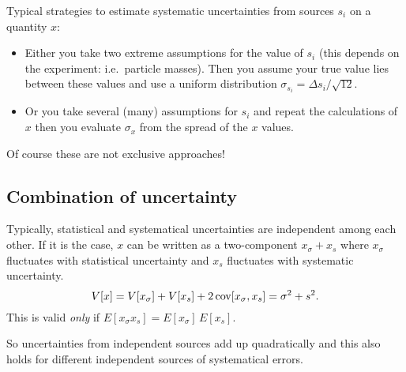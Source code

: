 Typical strategies to estimate systematic uncertainties from sources $s_i$ on a quantity $x$:
\begin{itemize}
	\item
		Either you take two extreme assumptions for the value of $s_i$ (this depends on the experiment: i.e.~particle masses).
		Then you assume your true value lies between these values and use a uniform distribution $\sigma_{s_i} = \Delta s_i/\sqrt{12}$.
	\item
		Or you take several (many) assumptions for $s_i$ and repeat the calculations of $x$ then you evaluate $\sigma_x$ from the spread of the $x$ values.
\end{itemize}
Of course these are not exclusive approaches!



\subsection{Combination of uncertainty}

Typically, statistical and systematical uncertainties are independent among each other.
If it is the case, $x$ can be written as a two-component $x_\sigma + x_s$ where $x_\sigma$ fluctuates with statistical uncertainty and  $x_s$ fluctuates with systematic uncertainty.
\begin{equation}
	V[x] = V[x_\sigma] + V[x_s] + 2 \operatorname{cov}[x_\sigma,x_s] = \sigma^2 + s^2.
\end{equation}
This is valid \emph{only} if $E[x_\sigma x_s] = E[x_\sigma]\,E[x_s]$.

So uncertainties from independent sources add up quadratically and this also holds for different independent sources of systematical errors.

